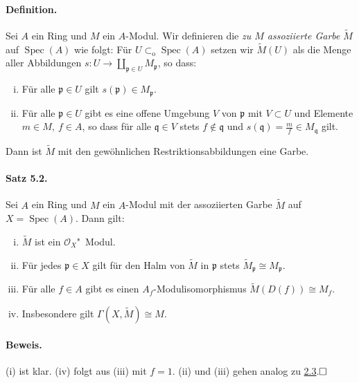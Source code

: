 \documentclass[11pt,b5paper,openany]{memoir}
\def \qed {$\hfill\square$}
\begin{document}
\paragraph{Definition.} Sei $A$ ein Ring und $M$ ein $A$-Modul. Wir definieren die \textit{zu $M$ assoziierte Garbe} $\widetilde{M}$ auf $\operatorname{Spec}(A)$ wie folgt: Für $U\subset_\text{o}\operatorname{Spec}(A)$ setzen wir $\widetilde{M}(U)$ als die Menge aller Abbildungen $s:U\to\coprod_{\mathfrak{p}\in U}M_\mathfrak{p}$, so dass:
\begin{enumerate}[(i)]
\item Für alle $\mathfrak{p}\in U$ gilt $s(\mathfrak{p})\in M_\mathfrak{p}$.
\item Für alle $\mathfrak{p}\in U$ gibt es eine offene Umgebung $V$ von $\mathfrak{p}$ mit $V\subset U$ und Elemente $m\in M,\ f\in A$, so dass für alle $\mathfrak{q}\in V$ stets $f\not\in\mathfrak{q}$ und $s(\mathfrak{q})=\frac{m}{f}\in M_\mathfrak{q}$ gilt.
\end{enumerate}
Dann ist $\widetilde{M}$ mit den gewöhnlichen Restriktionsabbildungen eine Garbe.

\paragraph{Satz 5.2.}\label{5.2} Sei $A$ ein Ring und $M$ ein $A$-Modul mit der assoziierten Garbe $\widetilde{M}$ auf $X=\operatorname{Spec}(A)$. Dann gilt:\begin{enumerate}[(i)]
\item $\widetilde{M}$ ist ein $\mathcal{O}_X$"~Modul.
\item Für jedes $\mathfrak{p}\in X$ gilt für den Halm von $\widetilde{M}$ in $\mathfrak{p}$ stets $\widetilde{M}_\mathfrak{p}\cong M_\mathfrak{p}$.
\item Für alle $f\in A$ gibt es einen $A_f$-Modulisomorphismus $\widetilde{M}(D(f))\cong M_f$.
\item Insbesondere gilt $\Gamma(X,\widetilde{M})\cong M$.
\end{enumerate}

\paragraph{Beweis.} (i) ist klar. (iv) folgt aus (iii) mit $f=1$. (ii) und (iii) gehen analog zu \hyperref[2.3]{2.3}.\qed
\end{document}

